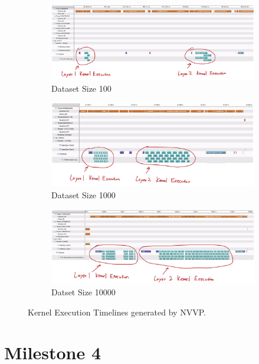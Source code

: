 \documentclass{article}
\begin{document}
\begin{figure}[H]
    \centering
    \begin{subfigure}[b]{\linewidth}
        \includegraphics[width=\linewidth]{nvvp100an}
        \caption{Dataset Size 100}
    \end{subfigure}
    \begin{subfigure}[b]{\linewidth}
        \includegraphics[width=\linewidth]{nvvp1000an}
        \caption{Dataset Size 1000}
    \end{subfigure}
    \begin{subfigure}[b]{\linewidth}
        \includegraphics[width=\linewidth]{nvvp10000an}
        \caption{Datset Size 10000}
    \end{subfigure}
    \caption{Kernel Execution Timelines generated by NVVP.}
\end{figure}

\part*{Milestone 4}
\setcounter{section}{0}
\end{document}
